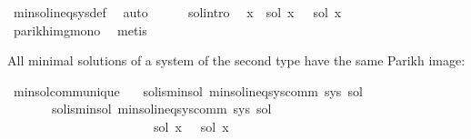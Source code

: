 \begin{isabellebody}
\ min{\isacharunderscore}{\kern0pt}sol{\isacharunderscore}{\kern0pt}ineq{\isacharunderscore}{\kern0pt}sys{\isacharunderscore}{\kern0pt}def\ \isamarkupfalse%
\ auto\isanewline
\ \ \ \ \isamarkupfalse%
\ sol{\isacharprime}{\kern0pt}{\isacharprime}{\kern0pt}{\isacharunderscore}{\kern0pt}intro\ \isamarkupfalse%
\ {\isachardoublequoteopen}{\isasymforall}x{\isachardot}{\kern0pt}\ {\isasymPsi}\ {\isacharparenleft}{\kern0pt}sol\ x{\isacharparenright}{\kern0pt}\ {\isasymsubseteq}\ {\isasymPsi}\ {\isacharparenleft}{\kern0pt}sol{\isacharprime}{\kern0pt}\ x{\isacharparenright}{\kern0pt}{\isachardoublequoteclose}\isanewline
\ \ \ \ \ \ \isamarkupfalse%
\ parikh{\isacharunderscore}{\kern0pt}img{\isacharunderscore}{\kern0pt}mono\ \isamarkupfalse%
\ metis\isanewline
\ \ \isamarkupfalse%
\isanewline
{}\isamarkupfalse%
%
\endisatagproof
{\isafoldproof}%
%
\isadelimproof
%
\endisadelimproof
%
\begin{isamarkuptext}%
All minimal solutions of a system of the second type have the same Parikh image:%
\end{isamarkuptext}\isamarkuptrue%
\isamarkupfalse%
\ min{\isacharunderscore}{\kern0pt}sol{\isacharunderscore}{\kern0pt}comm{\isacharunderscore}{\kern0pt}unique{\isacharcolon}{\kern0pt}\isanewline
\ \ \ sol{}{\isacharunderscore}{\kern0pt}is{\isacharunderscore}{\kern0pt}min{\isacharunderscore}{\kern0pt}sol{\isacharcolon}{\kern0pt}\ {\isachardoublequoteopen}min{\isacharunderscore}{\kern0pt}sol{\isacharunderscore}{\kern0pt}ineq{\isacharunderscore}{\kern0pt}sys{\isacharunderscore}{\kern0pt}comm\ sys\ sol{}{\isachardoublequoteclose}\isanewline
\ \ \ \ \ \ \ sol{}{\isacharunderscore}{\kern0pt}is{\isacharunderscore}{\kern0pt}min{\isacharunderscore}{\kern0pt}sol{\isacharcolon}{\kern0pt}\ {\isachardoublequoteopen}min{\isacharunderscore}{\kern0pt}sol{\isacharunderscore}{\kern0pt}ineq{\isacharunderscore}{\kern0pt}sys{\isacharunderscore}{\kern0pt}comm\ sys\ sol{}{\isachardoublequoteclose}\isanewline
\ \ \ \ \ \ \ \ \ \ \ \ \ \ \ \ \ \ \ \ \ \ {\isachardoublequoteopen}{\isasymPsi}\ {\isacharparenleft}{\kern0pt}sol{}\ x{\isacharparenright}{\kern0pt}\ {\isacharequal}{\kern0pt}\ {\isasymPsi}\ {\isacharparenleft}{\kern0pt}sol{}\ x{\isacharparenright}{\kern0pt}{\isachardoublequoteclose}\isanewline
%
\isadelimproof
%
\endisadelimproof
%

\end{isabellebody}
